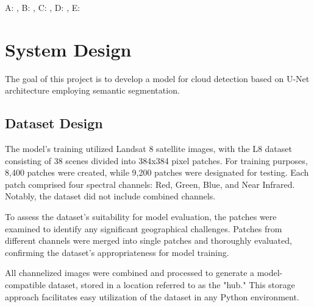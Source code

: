 \documentclass[conference]{IEEEtran}
\begin{document}
A: \cite{first}, B: \cite{second}, C: \cite{third}, D: \cite{fourth}, E: \cite{fifth}
\\
\section{System Design}
The goal of this project is to develop a model for cloud detection based on U-Net architecture employing semantic segmentation.

\subsection{Dataset Design}

The model's training utilized Landsat 8 satellite images, with the L8 dataset consisting of 38 scenes divided into 384x384 pixel patches. For training purposes, 8,400 patches were created, while 9,200 patches were designated for testing. Each patch comprised four spectral channels: Red, Green, Blue, and Near Infrared. Notably, the dataset did not include combined channels.

To assess the dataset's suitability for model evaluation, the patches were examined to identify any significant geographical challenges. Patches from different channels were merged into single patches and thoroughly evaluated, confirming the dataset's appropriateness for model training.

All channelized images were combined and processed to generate a model-compatible dataset, stored in a location referred to as the "hub." This storage approach facilitates easy utilization of the dataset in any Python environment.
\end{document}
